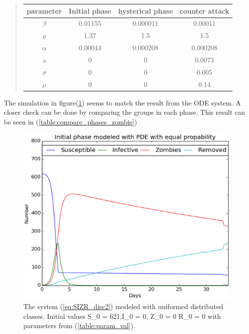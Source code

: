\documentclass[%
twoside,                 %
final,                   %
10pt]{article}
\begin{document}
\label{table:param_val}

\begin{quote}
\begin{tabular}{cccc}
\hline
\multicolumn{1}{c}{ parameter } & \multicolumn{1}{c}{ Initial phase } & \multicolumn{1}{c}{ hysterical phase } & \multicolumn{1}{c}{ counter attack } \\
\hline
$\beta$          & 0.01155          & 0.000011         & 0.00011          \\
$\varrho$        & 1.37             & 1.5              & 1.5              \\
$\alpha$         & 0.00044          & 0.000208         & 0.000208         \\
a                & 0                & 0                & 0.0073           \\
$\sigma$         & 0                & 0                & 0.005            \\
$\mu$            & 0                & 0                & 0.14             \\
\hline
\end{tabular}
\end{quote}

\noindent
The simulation in figure(\ref{fig:zombie_three_number}) seems to match the result from the ODE system. A closer check can be done by comparing the groups in each phase. This result can be seen in (\ref{table:compare_phases_zombie}) 


\begin{figure}[ht]
  \centerline{\includegraphics[width=0.8\linewidth]{plots/2D_zombie_three_phases_number.eps}}
  \caption{
  \label{fig:zombie_three_number} The system (\ref{eq:SIZR_disc2}) modeled with uniformed distributed classes. Initial values S_0 = 621,I_0 = 0, Z_0 = 0 R_0 = 0 with parameters from (\ref{table:param_val}).
  }
\end{figure}
\end{document}
